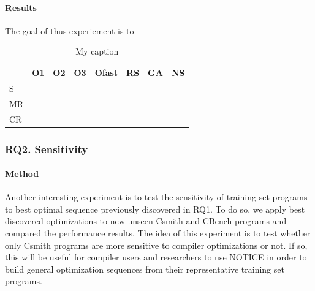 \paragraph{Results}
The goal of thus experiement is to 



\begin{table}[h]
	\centering
	\caption{My caption}
	\label{my-label}
	\begin{tabular}{|l|l|l|l|l|l|l|c|}
		\hline
		& O1                    & O2                    & O3                    & Ofast                 & RS                    & GA                    & NS \\ \hline
		S  & \multicolumn{1}{c|}{} & \multicolumn{1}{c|}{} & \multicolumn{1}{c|}{} & \multicolumn{1}{c|}{} & \multicolumn{1}{c|}{} & \multicolumn{1}{c|}{} &    \\ \hline
		MR &                       &                       &                       &                       &                       &                       &    \\ \hline
		CR &                       &                       &                       &                       &                       &                       &    \\ \hline
	\end{tabular}
\end{table}


\noindent{}
\subsubsection{RQ2. Sensitivity}
\paragraph{Method}
Another interesting experiment is to test the sensitivity of training set programs to best optimal sequence previously discovered in RQ1. To do so, we apply best discovered optimizations to new unseen Csmith and CBench programs and compared the performance results. The idea of this experiment is to test whether only Csmith programs are more sensitive to compiler optimizations or not. If so, this will be useful for compiler users and researchers to use NOTICE in order to build general optimization sequences from their representative training set programs.



